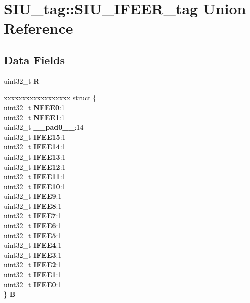\hypertarget{unionSIU__tag_1_1SIU__IFEER__tag}{}\section{S\+I\+U\+\_\+tag\+::S\+I\+U\+\_\+\+I\+F\+E\+E\+R\+\_\+tag Union Reference}
\label{unionSIU__tag_1_1SIU__IFEER__tag}
\subsection*{Data Fields}
\begin{DoxyCompactItemize}
\item 
\mbox{\label{unionSIU__tag_1_1SIU__IFEER__tag_a5587ac207fec9681336edee2da72be8b}} 
uint32\+\_\+t {\bfseries R}
\item 
\mbox{\label{unionSIU__tag_1_1SIU__IFEER__tag_a902de1ecfd72fd078a2744d71d7f4314}} 
\begin{tabbing}
xx\=xx\=xx\=xx\=xx\=xx\=xx\=xx\=xx\=\kill
struct \{\\
\>uint32\_t {\bfseries NFEE0}:1\\
\>uint32\_t {\bfseries NFEE1}:1\\
\>uint32\_t {\bfseries \_\_pad0\_\_}:14\\
\>uint32\_t {\bfseries IFEE15}:1\\
\>uint32\_t {\bfseries IFEE14}:1\\
\>uint32\_t {\bfseries IFEE13}:1\\
\>uint32\_t {\bfseries IFEE12}:1\\
\>uint32\_t {\bfseries IFEE11}:1\\
\>uint32\_t {\bfseries IFEE10}:1\\
\>uint32\_t {\bfseries IFEE9}:1\\
\>uint32\_t {\bfseries IFEE8}:1\\
\>uint32\_t {\bfseries IFEE7}:1\\
\>uint32\_t {\bfseries IFEE6}:1\\
\>uint32\_t {\bfseries IFEE5}:1\\
\>uint32\_t {\bfseries IFEE4}:1\\
\>uint32\_t {\bfseries IFEE3}:1\\
\>uint32\_t {\bfseries IFEE2}:1\\
\>uint32\_t {\bfseries IFEE1}:1\\
\>uint32\_t {\bfseries IFEE0}:1\\
\} {\bfseries B}\\


\end{tabbing}
\end{DoxyCompactItemize}
